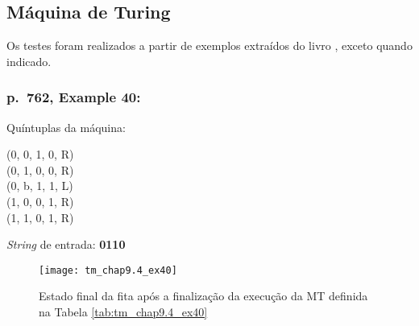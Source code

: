 \subsection{Máquina de Turing}

Os testes foram realizados a partir de exemplos extraídos do livro
\cite[cap.\ 9.4]{judith}, exceto quando indicado.

\subsubsection*{p.\ 762, Example 40:}

\begin{table}[H]
    \begin{minipage}{0.666\linewidth}

        \begin{minipage}{.5\linewidth}
            Quíntuplas da máquina:
        \end{minipage}%
        \begin{minipage}{.5\linewidth}
            \ttfamily
            (0, 0, 1, 0, R) \\
            (0, 1, 0, 0, R) \\
            (0, b, 1, 1, L) \\
            (1, 0, 0, 1, R) \\
            (1, 1, 0, 1, R)
        \end{minipage}

    \end{minipage}%
    \begin{minipage}{0.333\linewidth}

       \begin{flushright}
            \textit{String} de entrada: \textbf{0110}
       \end{flushright}

    \end{minipage}

    \caption{\cite[p.\ 762, Example 40]{judith}}
    \label{tab:tm_chap9.4_ex40}
\end{table}

\begin{figure}[H]
    \centering
    \texttt{[image: tm\_chap9.4\_ex40]}
    \caption{
        Estado final da fita após a finalização da execução da MT definida na
        Tabela \ref{tab:tm_chap9.4_ex40}
    }
    \label{fig:tm_chap9.4_ex40}
\end{figure}

